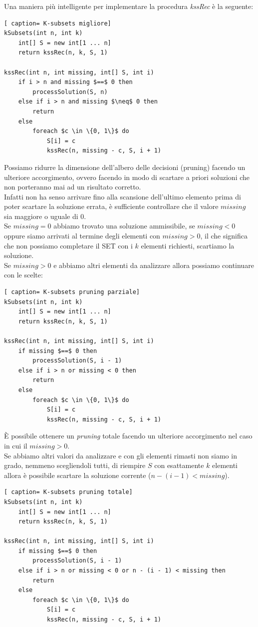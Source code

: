 \documentclass[../cheatSheetAlgoritmi.tex]{subfiles}
\begin{document}
Una maniera più intelligente per implementare la procedura \emph{kssRec} è la seguente:
 \begin{lstlisting}[ caption= K-subsets migliore]
kSubsets(int n, int k)
	int[] S = new int[1 ... n]
	return kssRec(n, k, S, 1)

kssRec(int n, int missing, int[] S, int i)
	if i > n and missing $==$ 0 then
		processSolution(S, n)
	else if i > n and missing $\neq$ 0 then
		return 
	else
		foreach $c \in \{0, 1\}$ do
			S[i] = c
			kssRec(n, missing - c, S, i + 1)
\end{lstlisting}
Possiamo ridurre la dimensione dell'albero delle decisioni (pruning) facendo un ulteriore accorgimento, ovvero facendo in  modo di scartare a priori soluzioni che non porteranno mai ad un risultato corretto. \\
Infatti non ha senso arrivare fino alla scansione dell'ultimo elemento prima di poter scartare la soluzione errata, è sufficiente controllare che il valore $missing$ sia maggiore o uguale di $0$. \\
Se $missing = 0$ abbiamo trovato una soluzione ammissibile, se $missing < 0$ oppure siamo arrivati al termine degli elementi con $missing > 0$, il che significa che non possiamo completare il SET con i $k$ elementi richiesti, scartiamo la soluzione. \\
Se $missing > 0$ e abbiamo altri elementi da analizzare allora possiamo continuare con le scelte:
 \begin{lstlisting}[ caption= K-subsets pruning parziale]
kSubsets(int n, int k)
	int[] S = new int[1 ... n]
	return kssRec(n, k, S, 1)

kssRec(int n, int missing, int[] S, int i)
	if missing $==$ 0 then
		processSolution(S, i - 1)
	else if i > n or missing < 0 then
		return 
	else
		foreach $c \in \{0, 1\}$ do
			S[i] = c
			kssRec(n, missing - c, S, i + 1)
\end{lstlisting}
È 	possibile ottenere un \emph{pruning} totale facendo un ulteriore accorgimento nel caso in cui il $missing > 0$. \\
Se abbiamo altri valori da analizzare e con gli elementi rimasti non siamo in grado, nemmeno scegliendoli tutti, di riempire $S$ con esattamente $k$ elementi allora è possibile scartare la soluzione corrente ($n - (i - 1) < missing$).  
 \begin{lstlisting}[ caption= K-subsets pruning totale]
kSubsets(int n, int k)
	int[] S = new int[1 ... n]
	return kssRec(n, k, S, 1)

kssRec(int n, int missing, int[] S, int i)
	if missing $==$ 0 then
		processSolution(S, i - 1)
	else if i > n or missing < 0 or n - (i - 1) < missing then
		return 
	else
		foreach $c \in \{0, 1\}$ do
			S[i] = c
			kssRec(n, missing - c, S, i + 1)
\end{lstlisting}
\end{document}
